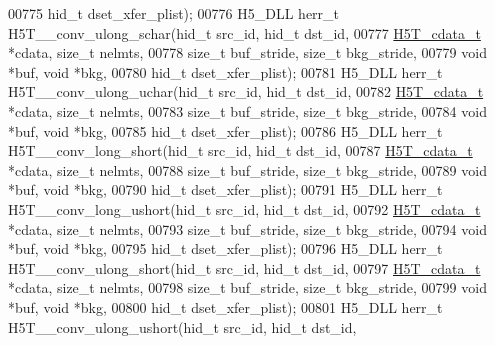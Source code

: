 \begin{DoxyCode}
00775                                    hid\_t dset\_xfer\_plist);
00776 H5\_DLL herr\_t H5T\_\_conv\_ulong\_schar(hid\_t src\_id, hid\_t dst\_id,
00777                     \hyperlink{struct_h5_t__cdata__t}{H5T\_cdata\_t} *cdata, \textcolor{keywordtype}{size\_t} nelmts,
00778                     \textcolor{keywordtype}{size\_t} buf\_stride, \textcolor{keywordtype}{size\_t} bkg\_stride,
00779                                     \textcolor{keywordtype}{void} *buf, \textcolor{keywordtype}{void} *bkg,
00780                                     hid\_t dset\_xfer\_plist);
00781 H5\_DLL herr\_t H5T\_\_conv\_ulong\_uchar(hid\_t src\_id, hid\_t dst\_id,
00782                     \hyperlink{struct_h5_t__cdata__t}{H5T\_cdata\_t} *cdata, \textcolor{keywordtype}{size\_t} nelmts,
00783                     \textcolor{keywordtype}{size\_t} buf\_stride, \textcolor{keywordtype}{size\_t} bkg\_stride,
00784                                     \textcolor{keywordtype}{void} *buf, \textcolor{keywordtype}{void} *bkg,
00785                                     hid\_t dset\_xfer\_plist);
00786 H5\_DLL herr\_t H5T\_\_conv\_long\_short(hid\_t src\_id, hid\_t dst\_id,
00787                    \hyperlink{struct_h5_t__cdata__t}{H5T\_cdata\_t} *cdata, \textcolor{keywordtype}{size\_t} nelmts,
00788                    \textcolor{keywordtype}{size\_t} buf\_stride, \textcolor{keywordtype}{size\_t} bkg\_stride,
00789                                    \textcolor{keywordtype}{void} *buf, \textcolor{keywordtype}{void} *bkg,
00790                                    hid\_t dset\_xfer\_plist);
00791 H5\_DLL herr\_t H5T\_\_conv\_long\_ushort(hid\_t src\_id, hid\_t dst\_id,
00792                     \hyperlink{struct_h5_t__cdata__t}{H5T\_cdata\_t} *cdata, \textcolor{keywordtype}{size\_t} nelmts,
00793                     \textcolor{keywordtype}{size\_t} buf\_stride, \textcolor{keywordtype}{size\_t} bkg\_stride,
00794                                     \textcolor{keywordtype}{void} *buf, \textcolor{keywordtype}{void} *bkg,
00795                                     hid\_t dset\_xfer\_plist);
00796 H5\_DLL herr\_t H5T\_\_conv\_ulong\_short(hid\_t src\_id, hid\_t dst\_id,
00797                     \hyperlink{struct_h5_t__cdata__t}{H5T\_cdata\_t} *cdata, \textcolor{keywordtype}{size\_t} nelmts,
00798                     \textcolor{keywordtype}{size\_t} buf\_stride, \textcolor{keywordtype}{size\_t} bkg\_stride,
00799                                     \textcolor{keywordtype}{void} *buf, \textcolor{keywordtype}{void} *bkg,
00800                                     hid\_t dset\_xfer\_plist);
00801 H5\_DLL herr\_t H5T\_\_conv\_ulong\_ushort(hid\_t src\_id, hid\_t dst\_id,

\end{DoxyCode}

